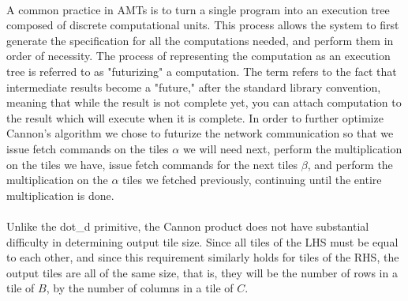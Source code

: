 \paragraph{}
A common practice in AMTs is to turn a single program into an execution tree composed of discrete computational units. This process allows the system to first generate the specification for all the computations needed, and perform them in order of necessity. The process of representing the computation as an execution tree is referred to as "futurizing" a computation. The term refers to the fact that intermediate results become a "future," after the standard library convention, meaning that while the result is not complete yet, you can attach computation to the result which will execute when it is complete. In order to further optimize Cannon's algorithm we chose to futurize the network communication so that we issue fetch commands on the tiles $\alpha$ we will need next, perform the multiplication on the tiles we have, issue fetch commands for the next tiles $\beta$, and perform the multiplication on the $\alpha$ tiles we fetched previously, continuing until the entire multiplication is done. 

\paragraph{}
Unlike the dot\_d primitive, the Cannon product does not have substantial difficulty in determining output tile size. Since all tiles of the LHS must be equal to each other, and since this requirement similarly holds for tiles of the RHS, the output tiles are all of the same size, that is, they will be the number of rows in a tile of $B$, by the number of columns in a tile of $C$.







